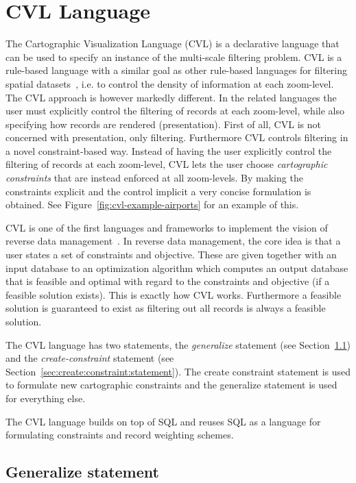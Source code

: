 \section{CVL Language}
\label{sec:cvl:language}
The Cartographic Visualization Language (CVL) is a declarative language that can be used to specify an instance of the multi-scale filtering problem. CVL is a rule-based language with a similar goal as other rule-based languages for filtering spatial datasets~\cite{sld,mapnik}, i.e. to control the density of information at each zoom-level. The CVL approach is however markedly different. In the related languages the user must explicitly control the filtering of records at each zoom-level, while also specifying how records are rendered (presentation). First of all, CVL is not concerned with presentation, only filtering. Furthermore CVL controls filtering in a novel constraint-based way. Instead of having the user explicitly control the filtering of records at each zoom-level, CVL lets the user choose \emph{cartographic constraints} that are instead enforced at all zoom-levels. By making the constraints explicit and the control implicit a very concise formulation is obtained. See Figure~\ref{fig:cvl-example-airports} for an example of this.

CVL is one of the first languages and frameworks to implement the vision of reverse data management~\cite{meliou2011reverse}. In reverse data management, the core idea is that a user states a set of constraints and objective. These are given together with an input database to an optimization algorithm which computes an output database that is feasible and optimal with regard to the constraints and objective (if a feasible solution exists). This is exactly how CVL works. Furthermore a feasible solution is guaranteed to exist as filtering out all records is always a feasible solution.

The CVL language has two statements, the \emph{generalize} statement (see Section~\ref{sec:generalize:statement}) and the \emph{create-constraint} statement (see Section~\ref{sec:create:constraint:statement}). The create constraint statement is used to formulate new cartographic constraints and the generalize statement is used for everything else. 

The CVL language builds on top of SQL and reuses SQL as a language for formulating constraints and record weighting schemes.

\subsection{Generalize statement}
\label{sec:generalize:statement}

